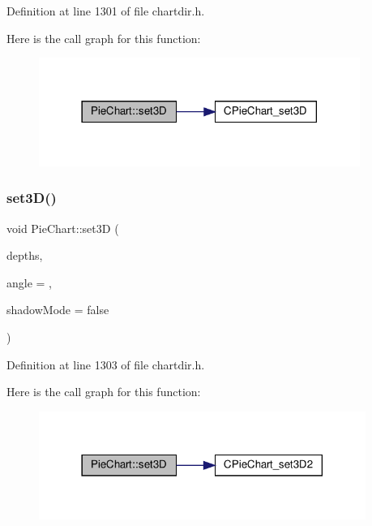 Definition at line 1301 of file chartdir.\+h.

Here is the call graph for this function\+:
\nopagebreak
\begin{figure}[H]
\begin{center}
\leavevmode
\includegraphics[width=297pt]{class_pie_chart_aea66f80b6f025b2abdff9c768de1d32c_cgraph}
\end{center}
\end{figure}
\mbox{\label{class_pie_chart_abf15c0001e392b137edb80397a2af0a4}} 
\subsubsection{\texorpdfstring{set3\+D()}{set3D()}\hspace{0.1cm}{\footnotesize\ttfamily [2/2]}}
{\footnotesize\ttfamily void Pie\+Chart\+::set3D (\begin{DoxyParamCaption}\item[{\hyperlink{class_double_array}{Double\+Array}}]{depths,  }\item[{double}]{angle = {},  }\item[{bool}]{shadow\+Mode = {\ttfamily false} }\end{DoxyParamCaption})\hspace{0.3cm}{\ttfamily [inline]}}



Definition at line 1303 of file chartdir.\+h.

Here is the call graph for this function\+:
\nopagebreak
\begin{figure}[H]
\begin{center}
\leavevmode
\includegraphics[width=302pt]{class_pie_chart_abf15c0001e392b137edb80397a2af0a4_cgraph}
\end{center}
\end{figure}
\mbox{\label{class_pie_chart_a83b93ed30618333fcb4d2bd669e5fb0f}} 
